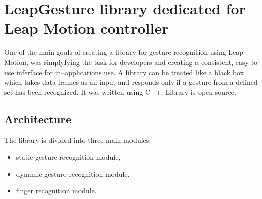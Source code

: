 
\chapter{LeapGesture library dedicated for Leap Motion controller}\label{libraryChapter}


One of the main goals of creating a library for gesture recognition using Leap Motion, was simplyfying the task for developers and creating a consistent, easy to use inferface for in--applications use. A library can be treated like a black box which takes data frames as an input and responds only if a gesture from a defined set has been recognized. It was written using C++. Library is open source.

\section{Architecture} \label{architectureSection}

The library is divided into three main modules:
\begin{itemize}
\item static gesture recognition module,
\item dynamic gesture recognition module,
\item finger recognition module.
\end{itemize}

